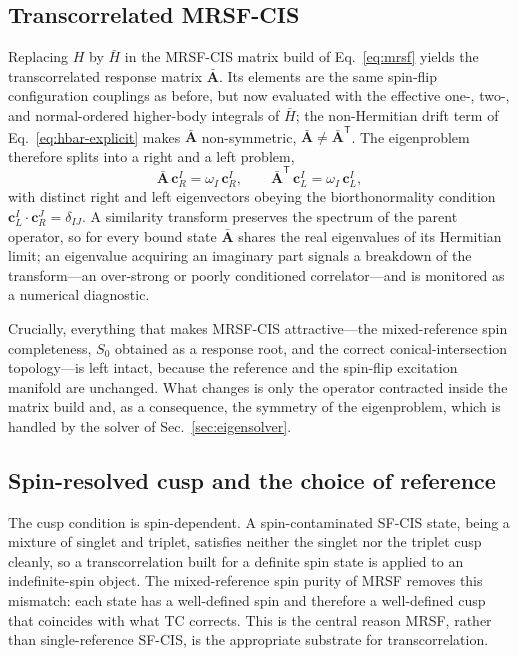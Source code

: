 \documentclass[aps,prb,reprint,superscriptaddress,floatfix]{revtex4-2}
\newcommand{\Hbar}{\bar{H}}
\begin{document}
\subsection{Transcorrelated MRSF-CIS}

Replacing $H$ by $\Hbar$ in the MRSF-CIS matrix build of Eq.~\eqref{eq:mrsf}
yields the transcorrelated response matrix $\bar{\mathbf{A}}$. Its elements are
the same spin-flip configuration couplings as before, but now evaluated with the
effective one-, two-, and normal-ordered higher-body integrals of $\Hbar$; the
non-Hermitian drift term of Eq.~\eqref{eq:hbar-explicit} makes $\bar{\mathbf{A}}$
non-symmetric, $\bar{\mathbf{A}}\neq\bar{\mathbf{A}}^{\mathsf{T}}$. The eigenproblem
therefore splits into a right and a left problem,
\begin{equation}
\bar{\mathbf{A}}\,\mathbf{c}^I_{\!R}=\omega_I\,\mathbf{c}^I_{\!R},
\qquad
\bar{\mathbf{A}}^{\mathsf{T}}\,\mathbf{c}^I_{\!L}=\omega_I\,\mathbf{c}^I_{\!L},
\label{eq:tcmrsf}
\end{equation}
with distinct right and left eigenvectors obeying the biorthonormality condition
$\mathbf{c}^{I}_{\!L}\!\cdot\mathbf{c}^{J}_{\!R}=\delta_{IJ}$. A similarity
transform preserves the spectrum of the parent operator, so for every bound state
$\bar{\mathbf{A}}$ shares the real eigenvalues of its Hermitian limit; an
eigenvalue acquiring an imaginary part signals a breakdown of the transform---an
over-strong or poorly conditioned correlator---and is monitored as a numerical
diagnostic.

Crucially, everything that makes MRSF-CIS attractive---the mixed-reference spin
completeness, $S_0$ obtained as a response root, and the correct
conical-intersection topology---is left intact, because the reference and the
spin-flip excitation manifold are unchanged. What changes is only the operator
contracted inside the matrix build and, as a consequence, the symmetry of the
eigenproblem, which is handled by the solver of Sec.~\ref{sec:eigensolver}.

\subsection{Spin-resolved cusp and the choice of reference}

The cusp condition is spin-dependent. A spin-contaminated SF-CIS state, being a
mixture of singlet and triplet, satisfies neither the singlet nor the triplet
cusp cleanly, so a transcorrelation built for a definite spin state is applied to
an indefinite-spin object. The mixed-reference spin purity of MRSF removes this
mismatch: each state has a well-defined spin and therefore a well-defined cusp
that coincides with what TC corrects. This is the central reason MRSF, rather
than single-reference SF-CIS, is the appropriate substrate for
transcorrelation.
\end{document}
